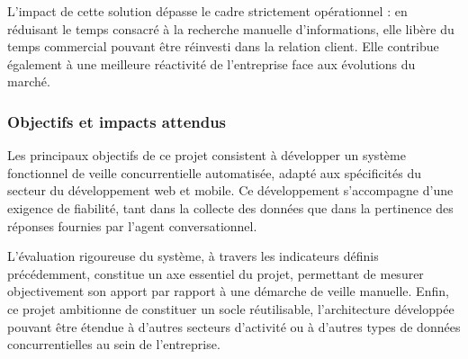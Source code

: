 L'impact de cette solution dépasse le cadre strictement opérationnel : en réduisant le temps consacré à la
recherche manuelle d'informations, elle libère du temps commercial pouvant être réinvesti dans la relation
client. Elle contribue également à une meilleure réactivité de l'entreprise face aux évolutions du marché.

\subsubsection{Objectifs et impacts attendus}

Les principaux objectifs de ce projet consistent à développer un système fonctionnel de veille
concurrentielle automatisée, adapté aux spécificités du secteur du développement web et mobile. Ce
développement s'accompagne d'une exigence de fiabilité, tant dans la collecte des données que dans la
pertinence des réponses fournies par l'agent conversationnel.

L'évaluation rigoureuse du système, à travers les indicateurs définis précédemment, constitue un axe
essentiel du projet, permettant de mesurer objectivement son apport par rapport à une démarche de veille
manuelle. Enfin, ce projet ambitionne de constituer un socle réutilisable, l'architecture développée pouvant
être étendue à d'autres secteurs d'activité ou à d'autres types de données concurrentielles au sein de
l'entreprise.